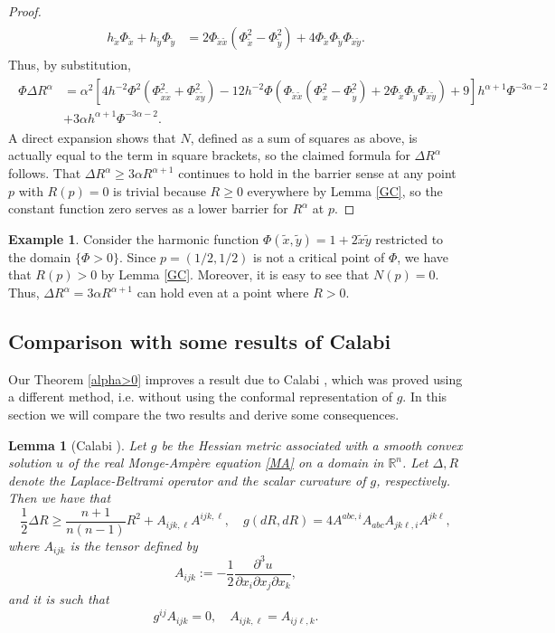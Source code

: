 \documentclass[11pt,reqno]{amsart}
\renewcommand{\geq}{\geqslant}
\theoremstyle{plain}
\newtheorem{lemma}[theorem]{Lemma}
\theoremstyle{definition}
\newtheorem{example}[theorem]{Example}
\numberwithin{equation}{section}
\begin{document}
\begin{proof}
\begin{align*}
\begin{split}
   h_{\tilde{x}}\Phi_{\tilde{x}}+h_{\tilde{y}}\Phi_{\tilde{y}}  & = 2\Phi_{\tilde{x}\tilde{x}}(\Phi_{\tilde{x}}^2-\Phi_{\tilde{y}}^2)+4\Phi_{\tilde{x}}\Phi_{\tilde{y}}\Phi_{\tilde{x}\tilde{y}}.
\end{split}\end{align*}
Thus, by substitution,
\begin{align*}\begin{split}
  \Phi\Delta R^{\alpha} 
      & =  \alpha^2[4h^{-2}\Phi^2(\Phi_{\tilde{x}\tilde{x}}^2+\Phi_{\tilde{x}\tilde{y}}^2)-12h^{-2}\Phi(\Phi_{\tilde{x}\tilde{x}}(\Phi_{\tilde{x}}^2-\Phi_{\tilde{y}}^2)+2\Phi_{\tilde{x}}\Phi_{\tilde{y}}\Phi_{\tilde{x}\tilde{y}})+9]h^{\alpha+1}\Phi^{-3\alpha-2}\\
      &\displaystyle +3\alpha h^{\alpha+1}\Phi^{-3\alpha-2}.
\end{split}\end{align*}
A direct expansion shows that $N$, defined as a sum of squares as above, is actually equal to the term in square brackets, so the claimed formula for $\Delta R^\alpha$ follows. That $\Delta R^\alpha \geq 3\alpha R^{\alpha + 1}$ continues to hold in the barrier sense at any point $p$ with $R(p) = 0$ is trivial because $R \geq 0$ everywhere by Lemma \ref{GC}, so the constant function zero serves as a lower barrier for $R^\alpha$ at $p$.
\end{proof}

\begin{example}\label{n=2} 
Consider the harmonic function $\Phi(\tilde{x},\tilde{y})=1+2\tilde{x}\tilde{y}$ restricted to the domain $\{\Phi > 0\}$. Since $p = (1/2, 1/2)$ is not a critical point of $\Phi$, we have that $R(p)>0$ by Lemma \ref{GC}. Moreover, it is easy to see that $N(p)=0$. Thus, $\Delta R^\alpha = 3\alpha R^{\alpha+1}$ can hold even at a point where $R > 0$.
\end{example}

\subsection{Comparison with some results of Calabi}

Our Theorem \ref{alpha>0} improves a result due to Calabi \cite{EC}, which was proved using a different method, i.e. without using the conformal representation of $g$. In this section we will compare the two results and derive some consequences.

\begin{lemma}[Calabi {\cite[Eq. 2.17--2.18]{EC}}]\label{alp}
    Let $g$ be the Hessian metric associated with a smooth convex solution $u$ of the real Monge-Ampère equation
\eqref{MA} on a domain in $\mathbb{R}^n$. Let $\Delta, R$ denote the Laplace-Beltrami operator and the scalar curvature of $g$, respectively. Then we have that
    $$\displaystyle \frac{1}{2}\Delta R\geq \frac{n+1}{n(n-1)}R^2+A_{ijk,\ell}A^{ijk,\ell}, \quad g(d R, d R)=4A^{abc,i}A_{abc}A_{jk\ell,i}A^{jk\ell},$$
    where $A_{ijk}$ is the tensor defined by
    $$A_{ijk}:=-\frac{1}{2} \frac{\partial^3 u}{\partial x_{i}\partial x_{j}\partial x_{k}},$$
    and it is such that
    $$g^{ij}A_{ijk}=0, \quad A_{ijk,\ell}=A_{ij\ell,k}.$$
\end{lemma}
\end{document}
